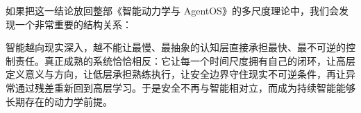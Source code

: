 如果把这一结论放回整部《智能动力学与 AgentOS》的多尺度理论中，我们会发现一个非常重要的结构关系：
\begin{statementbox}
\centering
{}
\end{statementbox}
智能越向现实深入，越不能让最慢、最抽象的认知层直接承担最快、最不可逆的控制责任。真正成熟的系统恰恰相反：它让每一个时间尺度拥有自己的闭环，让高层定义意义与方向，让低层承担熟练执行，让安全边界守住现实不可逆条件，再让异常通过残差重新回到高层学习。于是安全不再与智能相对立，而成为持续智能能够长期存在的动力学前提。
